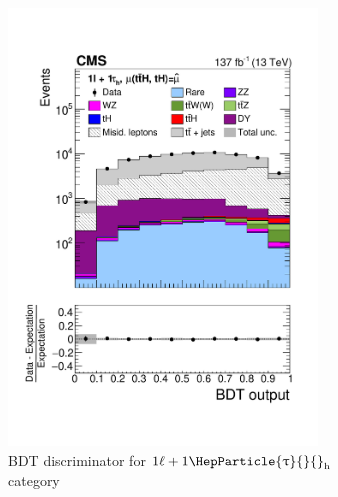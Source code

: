 \documentclass[12pt, a4paper]{article}
\DeclareRobustCommand{\PGt}{{\HepParticle{\uptau}{}{}}\xspace} %
\newcommand{\tauh}{\ensuremath{\PGt_\mathrm{h}}\xspace}
\begin{document}
\begin{figure}[htb!]
	\begin{subfigure}[b]{0.5\textwidth}
	\includegraphics[width=0.9\textwidth]{Fig/Figure_010-a.pdf}
	\caption{BDT discriminator for $1\ell+1\tauh$ category}
	\label{fig:tth_BDT}
\end{subfigure}
\begin{subfigure}[b]{0.5\textwidth}

\end{subfigure}
\end{figure}
\end{document}
